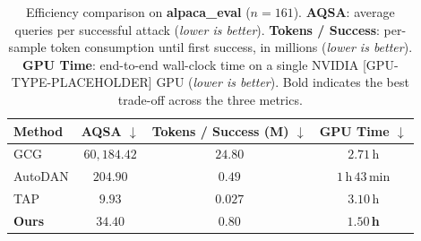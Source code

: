 \begin{table}[t]
  \centering
  \caption{Efficiency comparison on \textbf{alpaca\_eval} ($n{=}161$).
  \textbf{AQSA}: average queries per successful attack (\emph{lower is better}).
  \textbf{Tokens / Success}: per-sample token consumption until first success,
  in millions (\emph{lower is better}).
  \textbf{GPU Time}: end-to-end wall-clock time on a single NVIDIA
  [GPU-TYPE-PLACEHOLDER] GPU (\emph{lower is better}).
  Bold indicates the best trade-off across the three metrics.}
  \label{tab:efficiency}
  \small
  \begin{tabular}{lccc}
    \toprule
    \textbf{Method}
      & \textbf{AQSA} $\downarrow$
      & \textbf{Tokens / Success (M)} $\downarrow$
      & \textbf{GPU Time} $\downarrow$ \\
    \midrule
    GCG              & $60{,}184.42$          & $24.80$           & $2.71$\,h          \\
    AutoDAN          & $204.90$               & $0.49$            & $1$\,h\,$43$\,min  \\
    TAP              & $\mathbf{9.93}$        & $\mathbf{0.027}$  & $3.10$\,h          \\
    \textbf{Ours}    & $\mathbf{34.40}$       & $\mathbf{0.80}$   & $\mathbf{1.50}$\,\textbf{h} \\
    \bottomrule
  \end{tabular}
\end{table}

